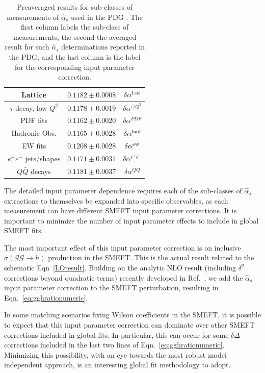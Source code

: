 \documentclass[twocolumn,nofootinbib,amsmath,amssymb,prl,aps,superscriptaddress,tightenlines,preprintnumbers]{revtex4}
\begin{document}
\begin{table}
\begin{tabular}{|c|c|c|}
\hline
{\rm Lattice} & $0.1182 \pm 0.0008$ &  $\delta \alpha^{\rm Lat}$ \\
\hline
{\rm $\tau$ decay, low $Q^2$} & $0.1178 \pm 0.0019$ &  $\delta \alpha^{\tau/Q^2}$ \\
\hline
{\rm PDF fits} & $0.1162 \pm 0.0020$ &  $\delta \alpha^{PDF}$ \\
\hline
{\rm Hadronic Obs.} & $0.1165 \pm 0.0028$ &  $\delta \alpha^{\rm had}$ \\
\hline
{\rm EW fits} & $0.1208 \pm 0.0028$ & $\delta \alpha^{\rm ew}$ \\
\hline
{\rm $e^+ e^-$ jets/shapes} & $0.1171 \pm 0.0031$ &  $\delta \alpha^{e^+ e^-}$ \\
\hline
{\rm $Q\bar{Q}$ decays} & $0.1181 \pm 0.0037$ & $\delta \alpha^{Q\bar{Q}}$ \\
\hline
 \end{tabular}
 \caption{Preaveraged results for sub-classes of measurements of $\hat{\alpha}_s$
 used in the PDG \cite{Workman:2022ynf}. The first column labels the sub-class of
 measurements, the second the averaged result for such $\hat{\alpha}_s$ determinations reported in the PDG,
 and the last column is the label for the corresponding input parameter correction.\label{table1}}
\end{table}
The detailed input parameter dependence requires each of the sub-classes of
$\hat{\alpha}_s$ extractions to themselves be expanded into specific observables, as each measurement
can have different SMEFT input parameter corrections. It is important to minimize the number
of input parameter effects to include in global SMEFT fits.

The most important effect of this input parameter correction is on
inclusive $\sigma(\mathcal{G}\mathcal{G} \rightarrow h)$
production in the SMEFT. This is the actual result
related to the schematic Eqn~\ref{LOresult}. Building on the analytic NLO result (including $\delta^2$ corrections
beyond quadratic terms) recently developed in
Ref.~\cite{Corbett:2021cil,Martin:2023fad}, we
add the $\hat{\alpha}_s$ input parameter correction to the SMEFT perturbation, resulting in
Eqn.~\ref{eq:gghrationumeric}.

In some matching scenarios fixing Wilson coefficients in the SMEFT, it is possible to
expect that this input parameter correction can dominate over other SMEFT corrections included
in global fits. In particular, this can occur for some $\delta \Delta$ corrections included
in the last two lines of Eqn.~\ref{eq:gghrationumeric}. Minimizing this possibility, with an eye towards
the most robust model independent approach, is an interesting global fit methodology to adopt.
\end{document}
